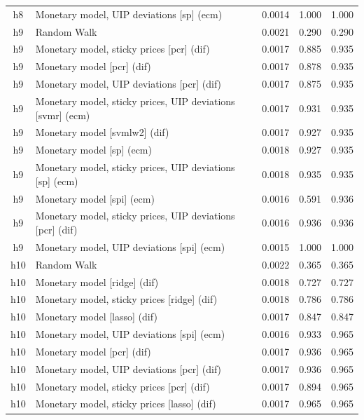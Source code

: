 \begin{ThreePartTable}
\begin{longtable}[t]{cp{5.5cm}ccc}
h8 & \raggedright Monetary model, UIP deviations [sp] (ecm) & 0.0014 & 1.000 & 1.000\\
\addlinespace
h9 & \raggedright Random Walk & 0.0021 & 0.290 & 0.290\\
h9 & \raggedright Monetary model, sticky prices [pcr] (dif) & 0.0017 & 0.885 & 0.935\\
h9 & \raggedright Monetary model [pcr] (dif) & 0.0017 & 0.878 & 0.935\\
h9 & \raggedright Monetary model, UIP deviations [pcr] (dif) & 0.0017 & 0.875 & 0.935\\
h9 & \raggedright Monetary model, sticky prices, UIP deviations [svmr] (ecm) & 0.0017 & 0.931 & 0.935\\
h9 & \raggedright Monetary model [svmlw2] (dif) & 0.0017 & 0.927 & 0.935\\
h9 & \raggedright Monetary model [sp] (ecm) & 0.0018 & 0.927 & 0.935\\
h9 & \raggedright Monetary model, sticky prices, UIP deviations [sp] (ecm) & 0.0018 & 0.935 & 0.935\\
h9 & \raggedright Monetary model [spi] (ecm) & 0.0016 & 0.591 & 0.936\\
h9 & \raggedright Monetary model, sticky prices, UIP deviations [pcr] (dif) & 0.0016 & 0.936 & 0.936\\
h9 & \raggedright Monetary model, UIP deviations [spi] (ecm) & 0.0015 & 1.000 & 1.000\\
\addlinespace
h10 & \raggedright Random Walk & 0.0022 & 0.365 & 0.365\\
h10 & \raggedright Monetary model [ridge] (dif) & 0.0018 & 0.727 & 0.727\\
h10 & \raggedright Monetary model, sticky prices [ridge] (dif) & 0.0018 & 0.786 & 0.786\\
h10 & \raggedright Monetary model [lasso] (dif) & 0.0017 & 0.847 & 0.847\\
h10 & \raggedright Monetary model, UIP deviations [spi] (ecm) & 0.0016 & 0.933 & 0.965\\
h10 & \raggedright Monetary model [pcr] (dif) & 0.0017 & 0.936 & 0.965\\
h10 & \raggedright Monetary model, UIP deviations [pcr] (dif) & 0.0017 & 0.936 & 0.965\\
h10 & \raggedright Monetary model, sticky prices [pcr] (dif) & 0.0017 & 0.894 & 0.965\\
h10 & \raggedright Monetary model, sticky prices [lasso] (dif) & 0.0017 & 0.965 & 0.965\\

\end{longtable}
\end{ThreePartTable}
